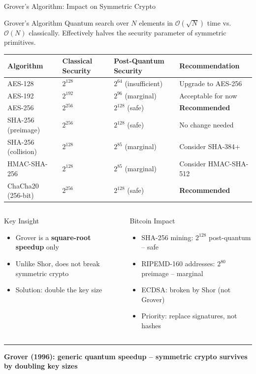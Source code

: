 \documentclass[8pt,aspectratio=169]{beamer}
\newcommand{\bottomnote}[1]{\vfill\vspace{-2mm}\textcolor{mllavender2}{\rule{\textwidth}{0.4pt}}\vspace{1mm}\footnotesize\textbf{#1}}
\begin{document}
\begin{frame}{Grover's Algorithm: Impact on Symmetric Crypto}
\begin{block}{Grover's Algorithm}
\small Quantum search over $N$ elements in $\mathcal{O}(\sqrt{N})$ time vs.\ $\mathcal{O}(N)$ classically. Effectively halves the security parameter of symmetric primitives.
\end{block}
\vspace{3mm}
\begin{center}
\small
\begin{tabular}{llll}
\toprule
\textbf{Algorithm} & \textbf{Classical Security} & \textbf{Post-Quantum Security} & \textbf{Recommendation} \\
\midrule
AES-128 & $2^{128}$ & $2^{64}$ (\textcolor{mlred}{insufficient}) & Upgrade to AES-256 \\
AES-192 & $2^{192}$ & $2^{96}$ (marginal) & Acceptable for now \\
AES-256 & $2^{256}$ & $2^{128}$ (\textcolor{mlgreen}{safe}) & \textcolor{mlgreen}{\textbf{Recommended}} \\
SHA-256 (preimage) & $2^{256}$ & $2^{128}$ (\textcolor{mlgreen}{safe}) & No change needed \\
SHA-256 (collision) & $2^{128}$ & $2^{85}$ (marginal) & Consider SHA-384+ \\
HMAC-SHA-256 & $2^{128}$ & $2^{85}$ (marginal) & Consider HMAC-SHA-512 \\
ChaCha20 (256-bit) & $2^{256}$ & $2^{128}$ (\textcolor{mlgreen}{safe}) & \textcolor{mlgreen}{\textbf{Recommended}} \\
\bottomrule
\end{tabular}
\end{center}
\vspace{3mm}
\begin{columns}
\begin{block}{Key Insight}
\begin{itemize}\small
  \item Grover is a \textbf{square-root speedup} only
  \item Unlike Shor, does not break symmetric crypto
  \item Solution: double the key size
\end{itemize}
\end{block}
\begin{block}{Bitcoin Impact}
\begin{itemize}\small
  \item SHA-256 mining: $2^{128}$ post-quantum -- safe
  \item RIPEMD-160 addresses: $2^{80}$ preimage -- marginal
  \item ECDSA: broken by Shor (not Grover)
  \item Priority: replace signatures, not hashes
\end{itemize}
\end{block}
\end{columns}
\bottomnote{Grover (1996): generic quantum speedup -- symmetric crypto survives by doubling key sizes}
\end{frame}
\end{document}
